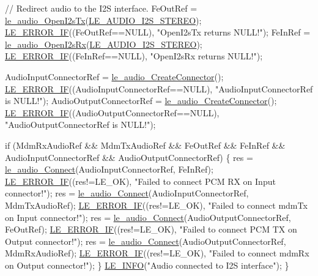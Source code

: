 \begin{DoxyCodeInclude}
{{{{    \textcolor{comment}{// Redirect audio to the I2S interface.}
    FeOutRef = \hyperlink{le__audio__interface_8h_a2633c1368adf60e342d7cadbbfa6278b}{le\_audio\_OpenI2sTx}(\hyperlink{le__audio__interface_8h_a94794180ed71a84bd26a1f525858f252a6ce77f5f956b203e15f662900a5103dd}{LE\_AUDIO\_I2S\_STEREO});
    \hyperlink{le__log_8h_aceaf11a11691d6c676e36dd317b38dbd}{LE\_ERROR\_IF}((FeOutRef==NULL), \textcolor{stringliteral}{"OpenI2sTx returns NULL!"});
    FeInRef = \hyperlink{le__audio__interface_8h_a9e7d0042c4f422554eb10d64535608e5}{le\_audio\_OpenI2sRx}(\hyperlink{le__audio__interface_8h_a94794180ed71a84bd26a1f525858f252a6ce77f5f956b203e15f662900a5103dd}{LE\_AUDIO\_I2S\_STEREO});
    \hyperlink{le__log_8h_aceaf11a11691d6c676e36dd317b38dbd}{LE\_ERROR\_IF}((FeInRef==NULL), \textcolor{stringliteral}{"OpenI2sRx returns NULL!"});

    AudioInputConnectorRef = \hyperlink{le__audio__interface_8h_a570aaf85086f00aca592acfbaaa237be}{le\_audio\_CreateConnector}();
    \hyperlink{le__log_8h_aceaf11a11691d6c676e36dd317b38dbd}{LE\_ERROR\_IF}((AudioInputConnectorRef==NULL), \textcolor{stringliteral}{"AudioInputConnectorRef is NULL!"});
    AudioOutputConnectorRef = \hyperlink{le__audio__interface_8h_a570aaf85086f00aca592acfbaaa237be}{le\_audio\_CreateConnector}();
    \hyperlink{le__log_8h_aceaf11a11691d6c676e36dd317b38dbd}{LE\_ERROR\_IF}((AudioOutputConnectorRef==NULL), \textcolor{stringliteral}{"AudioOutputConnectorRef is NULL!"});

    \textcolor{keywordflow}{if} (MdmRxAudioRef && MdmTxAudioRef && FeOutRef && FeInRef &&
        AudioInputConnectorRef && AudioOutputConnectorRef)
    \{
        res = \hyperlink{le__audio__interface_8h_a338df65b2fb1ae0140d86880adbcf0de}{le\_audio\_Connect}(AudioInputConnectorRef, FeInRef);
        \hyperlink{le__log_8h_aceaf11a11691d6c676e36dd317b38dbd}{LE\_ERROR\_IF}((res!=LE\_OK), \textcolor{stringliteral}{"Failed to connect PCM RX on Input connector!"});
        res = \hyperlink{le__audio__interface_8h_a338df65b2fb1ae0140d86880adbcf0de}{le\_audio\_Connect}(AudioInputConnectorRef, MdmTxAudioRef);
        \hyperlink{le__log_8h_aceaf11a11691d6c676e36dd317b38dbd}{LE\_ERROR\_IF}((res!=LE\_OK), \textcolor{stringliteral}{"Failed to connect mdmTx on Input connector!"});
        res = \hyperlink{le__audio__interface_8h_a338df65b2fb1ae0140d86880adbcf0de}{le\_audio\_Connect}(AudioOutputConnectorRef, FeOutRef);
        \hyperlink{le__log_8h_aceaf11a11691d6c676e36dd317b38dbd}{LE\_ERROR\_IF}((res!=LE\_OK), \textcolor{stringliteral}{"Failed to connect PCM TX on Output connector!"});
        res = \hyperlink{le__audio__interface_8h_a338df65b2fb1ae0140d86880adbcf0de}{le\_audio\_Connect}(AudioOutputConnectorRef, MdmRxAudioRef);
        \hyperlink{le__log_8h_aceaf11a11691d6c676e36dd317b38dbd}{LE\_ERROR\_IF}((res!=LE\_OK), \textcolor{stringliteral}{"Failed to connect mdmRx on Output connector!"});
    \}
    \hyperlink{le__log_8h_a23e6d206faa64f612045d688cdde5808}{LE\_INFO}(\textcolor{stringliteral}{"Audio connected to I2S interface"});
\}


}}}}
\end{DoxyCodeInclude}
